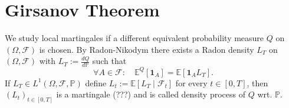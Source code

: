 \documentclass[a4paper,12pt,twoside]{article}
\begin{document}
\section{Girsanov Theorem}
We study local martingales if a different equivalent probability measure $Q$ on $(\Omega,\mathcal{F})$ is chosen. 
By Radon-Nikodym there exists a Radon density $L_T$ on $(\Omega,\mathcal{F})$ with $L_T := \frac{dQ}{d \mathbb{P}}$ such that 
\[
\forall A \in \mathcal{F}: \quad \mathbb{E}^Q[\textbf{1}_A] = \mathbb{E}[\textbf{1}_A L_T].
\]
If $L_T \in L^1(\Omega,\mathcal{F},\mathbb{P})$ define $L_t := \mathbb{E}[L_T \mid \mathcal{F}_t]$ for every $t \in [0,T]$, then $(L_t)_{t \in [0,T]}$ is a martingale (???) and is called density process of $Q$ wrt. $\mathbb{P}$.
\end{document}
